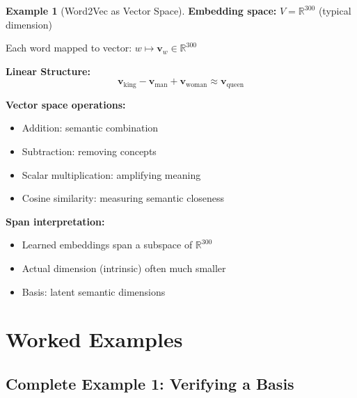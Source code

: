 \documentclass[12pt,a4paper]{article}
\theoremstyle{definition}
\newtheorem{example}{Example}[section]
\begin{document}
\begin{example}[Word2Vec as Vector Space]
\textbf{Embedding space:} $V = \mathbb{R}^{300}$ (typical dimension)

Each word mapped to vector: $w \mapsto \mathbf{v}_w \in \mathbb{R}^{300}$

\textbf{Linear Structure:}
\begin{equation}
\mathbf{v}_{\text{king}} - \mathbf{v}_{\text{man}} + \mathbf{v}_{\text{woman}} \approx \mathbf{v}_{\text{queen}}
\end{equation}

\textbf{Vector space operations:}
\begin{itemize}
    \item Addition: semantic combination
    \item Subtraction: removing concepts
    \item Scalar multiplication: amplifying meaning
    \item Cosine similarity: measuring semantic closeness
\end{itemize}

\textbf{Span interpretation:}
\begin{itemize}
    \item Learned embeddings span a subspace of $\mathbb{R}^{300}$
    \item Actual dimension (intrinsic) often much smaller
    \item Basis: latent semantic dimensions
\end{itemize}
\end{example}

\section{Worked Examples}

\subsection{Complete Example 1: Verifying a Basis}
\end{document}

